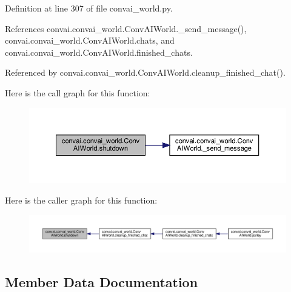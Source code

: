Definition at line 307 of file convai\+\_\+world.\+py.



References convai.\+convai\+\_\+world.\+Conv\+A\+I\+World.\+\_\+send\+\_\+message(), convai.\+convai\+\_\+world.\+Conv\+A\+I\+World.\+chats, and convai.\+convai\+\_\+world.\+Conv\+A\+I\+World.\+finished\+\_\+chats.



Referenced by convai.\+convai\+\_\+world.\+Conv\+A\+I\+World.\+cleanup\+\_\+finished\+\_\+chat().

Here is the call graph for this function\+:
\nopagebreak
\begin{figure}[H]
\begin{center}
\leavevmode
\includegraphics[width=350pt]{classconvai_1_1convai__world_1_1ConvAIWorld_a23af0c25e74dc7901662aebef74bf10c_cgraph}
\end{center}
\end{figure}
Here is the caller graph for this function\+:
\nopagebreak
\begin{figure}[H]
\begin{center}
\leavevmode
\includegraphics[width=350pt]{classconvai_1_1convai__world_1_1ConvAIWorld_a23af0c25e74dc7901662aebef74bf10c_icgraph}
\end{center}
\end{figure}


\subsection{Member Data Documentation}
\mbox{\label{classconvai_1_1convai__world_1_1ConvAIWorld_a652682be0f17ea53bd8813cbcccfc48e}} 
